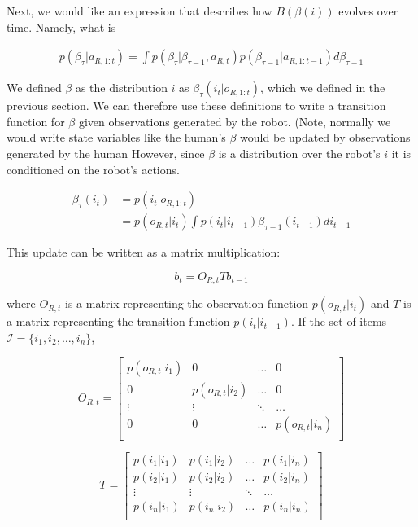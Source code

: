 \documentclass{article}
\begin{document}
Next, we would like an expression that describes how $B(\beta(i))$ evolves over time. Namely, what is 

\begin{align}
	p(\beta_\tau | a_{R,1:t}) = \int p(\beta_\tau | \beta_{\tau-1}, a_{R,t}) p(\beta_{\tau-1} | a_{R,1:t-1}) d \beta_{\tau-1}
\end{align}

We defined $\beta$ as the distribution $i$  as $\beta_\tau(i_t | o_{R, 1:t})$, which we defined in the previous section. We can therefore use these definitions to write a transition function for $\beta$ given observations generated by the robot. (Note, normally we would write state variables like the human's $\beta$ would be updated by observations generated by the human  However, since $\beta$ is a distribution over the robot's $i$ it is conditioned on the robot's actions. 


\begin{align}
	\beta_\tau(i_{t}) &= p(i_{t} | o_{R, 1:t}) \\
	&= p(o_{R,t}|i_t) \int p(i_t|i_{t-1})\beta_{\tau-1}(i_{t-1}) d i_{t-1} \end{align}


This update can be written as a matrix multiplication: 

$$b_t = O_{R,t}T b_{t-1}$$

where $O_{R,t}$ is a matrix representing the observation function $p(o_{R,t} | i_t)$ and $T$ is a matrix representing the transition function $p(i_t|i_{t-1})$. If the set of items $\mathcal{I} = \{ i_1, i_2, \ldots, i_n\}$, 

\begin{equation}
	O_{R,t} = \left[\begin{matrix} 
		p(o_{R,t} | i_1) & 0 & \ldots & 0 \\
		0 & p(o_{R,t} | i_2) & \ldots & 0 \\
		\vdots & \vdots & \ddots & \ldots  \\
		0 & 0 & \ldots  &  p(o_{R,t} | i_n) \\
	\end{matrix}
\right]
\end{equation}
		
\begin{equation}
	T = \left[\begin{matrix} 
			p(i_1 | i_1) & p(i_1| i_2)  & \ldots & p(i_1 | i_n) \\
			p(i_2 | i_1) & p(i_2 | i_2) & \ldots & p(i_2 | i_n) \\
			\vdots & \vdots & \ddots & \ldots  \\
			p(i_n | i_1) & p(i_n | i_2) & \ldots  &  p(i_n | i_n) \\
	\end{matrix}
\right]
\end{equation}
\end{document}
